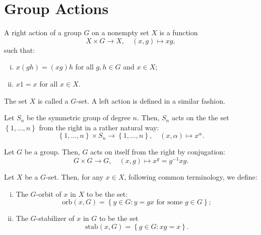 \section{Group Actions}\label{sec:group-actions}

\begin{definition}\label{def:group-action}
  A right action of a group \(G\) on a nonempty set \(X\) is a function
  \[
    X\times{G}\to{X},\quad(x,g)\mapsto{xg},
  \]
  such that:
  \begin{enumerate}[i.]
    \item
      \(x(gh)=(xg)h\) for all \(g,h\in{G}\) and \(x\in{X}\);
    \item
      \(x1=x\) for all \(x\in{X}\).
  \end{enumerate}
  The set \(X\) is called a \(G\)-set. A left action is defined in a similar
  fashion.
\end{definition}

\begin{example}\label{ex:action-of-symmetric-groups}
  Let \(S_{n}\) be the symmetric group of degree \(n\). Then, \(S_{n}\) acts on the the set \(\left\{1,\ldots,n\right\}\) from the right in a rather natural way:
  \[
    \left\{1,\ldots,n\right\}\times{S_{n}}\to\left\{1,\ldots,n\right\},
    \quad
    (x,\alpha)\mapsto{x^{\alpha}}.
  \]
\end{example}

\begin{example}\label{ex:conjugation}
  Let \(G\) be a group. Then, \(G\) acts on itself from the right by conjugation:
  \[
    G\times{G}\to{G},\quad(x,g)\mapsto{x^{g}=g^{-1}xg}.
  \]
\end{example}

\begin{definition}\label{def:orbits-and-stabilizers}
  Let \(X\) be a \(G\)-set. Then, for any \({x}\in{X}\), following common terminology, we define:
  \begin{enumerate}[i.]
    \item
      The \(G\)-orbit of \(x\) in \(X\) to be the set:
      \[
        \text{orb}(x,G)
        =
        \left\{y\in{G}:y=gx\text{ for some }g\in{G}\right\};
      \]
    \item
      The \(G\)-stabilizer of \(x\) in \(G\) to be the set
      \[
        \text{stab}(x,G)
        =
        \left\{g\in{G}:xg=x\right\}.
      \]
  \end{enumerate}
\end{definition}

